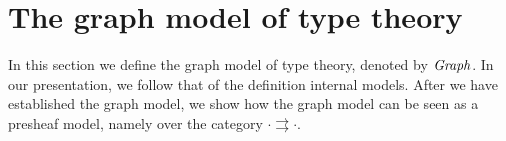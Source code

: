 \begin{comment}
\begin{defn}
A function $f:\prd{x:\terms{A}}\terms{\subst{x}{P}}$ is said to be \emph{continuous}
if there is a term of type
\begin{equation*}
\prd{x,y:\terms{A}}\terms{\subst{\ctxwk{A}{\mathcal{T}rans_{x,y}}}{\ctxwk{\idtypevar{A}}{\idtypevar{\subst{y}{P}}}}}.
\end{equation*}
\end{defn}

\begin{lem}
If all functions are ``continuous mappings of terms'' then types without terms
are empty, i.e.\ we have
\begin{equation*}
(\terms{A}\to\emptyt)\to\terms{A\to\emptyt^\mfGraph}
\end{equation*}
\end{lem}

\begin{proof}
Any function from a type without terms is vacuously continuous.
\end{proof}

We will see that in the graph model functions are not just continuous mappings
of terms, since there is a graph $\tilde{\emptyt}$ which has no terms but which
differs from the empty graph nevertheless.

\begin{desiderata}
The following may relate to functions being continuous mappings of terms (it
seems to be a very strong condition):
\begin{enumerate}
\item We have the adjunctions $\tfcolim\dashv\Delta\dashv\tflim$ in which the
two monads are idempotent (we don't even have the adjunctions for $\mfGraph$).
\item $\eqv{\terms{\Omega}}{\ctx}$
\end{enumerate}
We also need to check whether all functions in the reflexive graphs have this
property (if not, ditch this section).
\end{desiderata}
\end{comment}

\section{The graph model of type theory}
In this section we define the graph model of type theory, denoted by
$\mathit{Graph}$.  In our presentation, we follow that of the definition internal
models. After we have established the graph model, we show how the graph
model can be seen as a presheaf model, namely over the category $\cdot
{\rightrightarrows}\cdot$.

